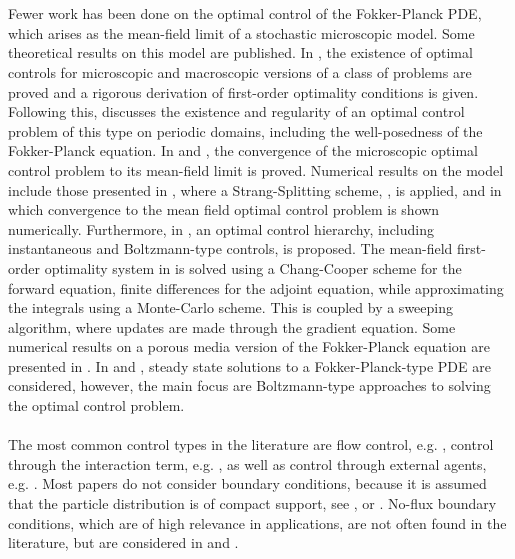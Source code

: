 \\
\\
Fewer work has been done on the optimal control of the Fokker-Planck PDE, which arises as the mean-field limit of a stochastic microscopic model. Some theoretical results on this model are published. In \cite{albi2016mean}, the existence of optimal controls for microscopic and macroscopic versions of a class of problems are proved and a rigorous derivation of first-order optimality conditions is given. 
Following this, \cite{carrillo2019mean} discusses the existence and regularity of an optimal control problem of this type on periodic domains, including the well-posedness of the Fokker-Planck equation. In \cite{Pinnau_2017} and  \cite{carrillo2018no1}, the convergence of the microscopic optimal control problem to its mean-field limit is proved.
Numerical results on the model include those presented in \cite{Pinnau_2017}, where a Strang-Splitting scheme, \cite{gilbertstrang1}, is applied, and in which convergence to the mean field optimal control problem is shown numerically. Furthermore, in \cite{albi2016mean}, an optimal control hierarchy, including instantaneous and Boltzmann-type controls, is proposed. The mean-field first-order optimality system in \cite{albi2016mean} is solved using a Chang-Cooper scheme for the forward equation, finite differences for the adjoint equation, while approximating the integrals using a Monte-Carlo scheme. This is coupled by a sweeping algorithm, where updates are made through the gradient equation.
Some numerical results on a porous media version of the Fokker-Planck equation are presented in \cite{carrillo2018no1}. In \cite{Albi_2014no1} and \cite{albi2014kinetic}, steady state solutions to a Fokker-Planck-type PDE are considered, however, the main focus  are Boltzmann-type approaches to solving the optimal control problem.
\\
\\
The most common control types in the literature are flow control, e.g. \cite{albi2016mean}, control through the interaction term, e.g. \cite{Pinnau_2017}, as well as control through external agents, e.g. \cite{Fornasier_2014no2}. 
Most papers do not consider boundary conditions, because it is assumed that the particle distribution is of compact support, see \cite{burger2019meanfield}, \cite{fornasier_lisini_orrieri_savare_2019} or \cite{burger2016controlling}. No-flux boundary conditions, which are of high relevance in applications, are not often found in the literature, but are considered in \cite{albi2016mean} and \cite{carrillo2018no1}.
